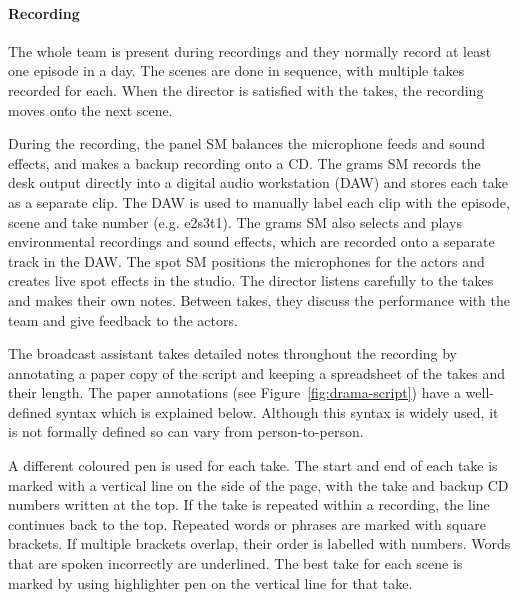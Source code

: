 \paragraph{Recording}
The whole team is present during recordings and they normally record at least one episode in a day. The scenes are done
in sequence, with multiple takes recorded for each. When the director is satisfied with the takes, the recording moves
onto the next scene.

During the recording, the panel SM balances the microphone feeds and sound effects, and makes a backup recording onto a
CD. The grams SM records the desk output directly into a digital audio workstation (DAW) and stores each take as a
separate clip. The DAW is used to manually label each clip with the episode, scene and take number (e.g. e2s3t1). The
grams SM also selects and plays environmental recordings and sound effects, which are recorded onto a separate track in
the DAW. The spot SM positions the microphones for the actors and creates live spot effects in the studio. The director
listens carefully to the takes and makes their own notes.  Between takes, they discuss the performance with the team
and give feedback to the actors.

The broadcast assistant takes detailed notes throughout the recording by annotating a paper copy of the script and
keeping a spreadsheet of the takes and their length. The paper annotations (see Figure~\ref{fig:drama-script}) have a
well-defined syntax which is explained below. Although this syntax is widely used, it is not formally defined so can
vary from person-to-person.

A different coloured pen is used for each take. The start and end of each take is marked with a vertical line on the
side of the page, with the take and backup CD numbers written at the top. If the take is repeated within a recording,
the line continues back to the top. Repeated words or phrases are marked with square brackets. If multiple brackets
overlap, their order is labelled with numbers.  Words that are spoken incorrectly are underlined. The best take for
each scene is marked by using highlighter pen on the vertical line for that take.

